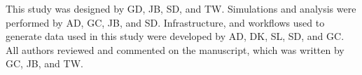 \documentclass[NETN]{stjour}
\begin{document}
\authorcontributions 
This study was designed by GD, JB, SD, and TW. Simulations and analysis were performed by AD, GC, JB, and SD. Infrastructure, and workflows used to generate data used in this study were developed by AD, DK, SL, SD, and GC.  All authors reviewed and commented on the manuscript, which was written by GC, JB, and TW.

\newpage



\end{document}
